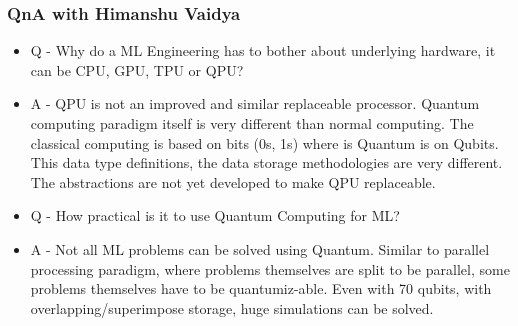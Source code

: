 \begin{frame}[fragile]\frametitle{QnA with Himanshu Vaidya}


\begin{itemize}
\item Q - Why do a ML Engineering has to bother about underlying hardware, it can be CPU, GPU, TPU or QPU?
\item A - QPU is not an improved and similar replaceable processor. Quantum computing paradigm itself is very different than normal computing. The classical computing is based on bits (0s, 1s) where is Quantum is on Qubits. This data type definitions, the data storage methodologies are very different. The abstractions are not yet developed to make QPU replaceable.
\end{itemize}

\begin{itemize}
\item Q - How practical is it to use Quantum Computing for ML?
\item A - Not all ML problems can be solved using Quantum. Similar to parallel processing paradigm, where problems themselves are split to be parallel, some problems themselves have to be quantumiz-able. Even with 70 qubits, with overlapping/superimpose storage, huge simulations can be solved.
\end{itemize}
\end{frame}